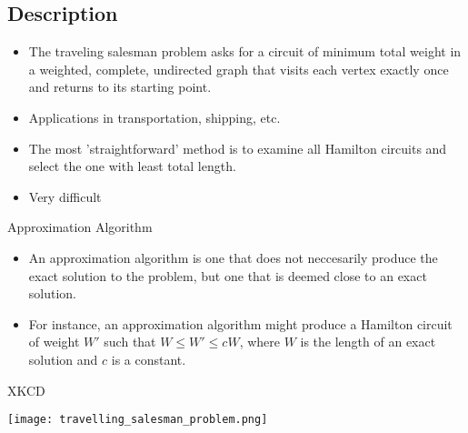 \documentclass{beamer}
\begin{document}
\subsection{Description}
\begin{frame}
	\begin{itemize}
	\item
		The \alert{traveling salesman problem} asks for a circuit of minimum total weight in a weighted, complete, undirected graph that visits each vertex exactly once and returns to its starting point.
	\item
		Applications in transportation, shipping, etc.
	\item
		The most 'straightforward' method is to examine all Hamilton circuits and select the one with least total length.
	\item
		Very difficult
	\end{itemize}
\end{frame}

\begin{frame}{Approximation Algorithm}
	\begin{itemize}
	\item
		An \alert{approximation algorithm} is one that does not neccesarily produce the exact solution to the problem, but one that is deemed close to an exact solution.
	\item
		For instance, an approximation algorithm might produce a Hamilton circuit of weight $W'$ such that $W \leq W' \leq cW$, where $W$ is the length of an exact solution and $c$ is a constant.
	\end{itemize}
\end{frame}
\begin{frame}{XKCD}
\centerline{\texttt{[image: travelling\_salesman\_problem.png]}}
\end{frame}
\end{document}
